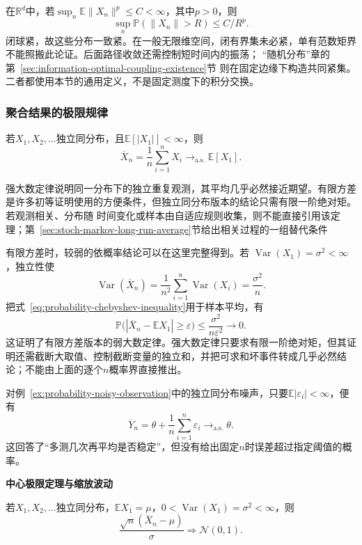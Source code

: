 在\(\mathbb R^d\)中，若\(\sup_n\mathbb E\|X_n\|^p\leq C<\infty\)，其中\(p>0\)，则
\[
\sup_n\mathbb P(\|X_n\|>R)\leq C/R^p.
\]
闭球紧，故这些分布一致紧。在一般无限维空间，闭有界集未必紧，单有范数矩界不能照搬此论证。后面路径收敛还需控制短时间内的振荡；
“随机分布”章的第~\ref{sec:information-optimal-coupling-existence}节
则在固定边缘下构造共同紧集。二者都使用本节的通用定义，不是固定测度下的积分交换。

\subsubsection{聚合结果的极限规律}
\label{sec:rv-aggregate-limits}
\begin{theorem}[强大数定律]
\label{thm:probability-strong-law-large-numbers}
若\(X_1,X_2,\ldots\)独立同分布，且\(\mathbb{E}[|X_1|]<\infty\)，则
\[ \overline{X}_n
  =\frac{1}{n}\sum_{i=1}^{n}X_i\to_{\mathrm{a.s.}}\mathbb{E}[X_1]. \]
\end{theorem}

强大数定律说明同一分布下的独立重复观测，其平均几乎必然接近期望。有限方差是许多初等证明使用的方便条件，但独立同分布版本的结论只需有限一阶绝对矩。若观测相关、分布随
时间变化或样本由自适应规则收集，则不能直接引用该定理；第~\ref{sec:stoch-markov-long-run-average}节给出相关过程的一组替代条件

有限方差时，较弱的依概率结论可以在这里完整得到。若
\(\operatorname{Var}(X_1)=\sigma^2<\infty\)，独立性使
\[
  \operatorname{Var}(\overline{X}_n)
  =\frac{1}{n^2}\sum_{i=1}^{n}\operatorname{Var}(X_i)
  =\frac{\sigma^2}{n}.
\]
把式~\eqref{eq:probability-chebyshev-inequality}用于样本平均，有
\[
  \mathbb{P}\bigl(
    |\overline{X}_n-\mathbb{E}X_1|\geq\varepsilon
  \bigr)
  \leq\frac{\sigma^2}{n\varepsilon^2}\to0.
\]
这证明了有限方差版本的弱大数定律。强大数定律只要求有限一阶绝对矩，但其证明还需截断大取值、控制截断变量的独立和，并把可求和坏事件转成几乎必然结论；不能由上面的逐个\(n\)概率界直接推出。

对例~\ref{ex:probability-noisy-observation}中的独立同分布噪声，只要\(\mathbb{E}|\varepsilon_i|<\infty\)，便有
\[ \overline{Y}_n
  =\theta+\frac{1}{n}\sum_{i=1}^{n}\varepsilon_i\to_{\mathrm{a.s.}}\theta. \]
这回答了“多测几次再平均是否稳定”，但没有给出固定\(n\)时误差超过指定阈值的概率。

\par\medskip\noindent\textbf{中心极限定理与缩放波动}\quad
\begin{theorem}
\label{thm:probability-iid-central-limit}
若\(X_1,X_2,\ldots\)独立同分布，\(\mathbb{E}X_1=\mu\)，\(0<\operatorname{Var}(X_1)=\sigma^2<\infty\)，则
\[ \frac{\sqrt{n}(\overline{X}_n-\mu)}{\sigma}
  \Rightarrow\mathcal{N}(0,1). \]
\end{theorem}

